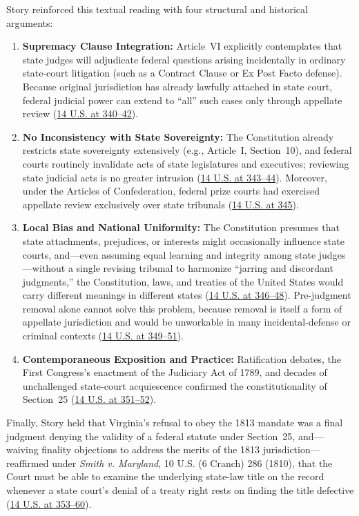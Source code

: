 \documentclass[12pt]{article}
\begin{document}
Story reinforced this textual reading with four structural and historical arguments:
\begin{enumerate}
    \item \textbf{Supremacy Clause Integration:} Article~VI explicitly contemplates that state judges will adjudicate federal questions arising incidentally in ordinary state-court litigation (such as a Contract Clause or Ex Post Facto defense). Because original jurisdiction has already lawfully attached in state court, federal judicial power can extend to ``all'' such cases only through appellate review (\href{https://supreme.justia.com/cases/federal/us/14/304/}{14 U.S. at 340--42}).
    \item \textbf{No Inconsistency with State Sovereignty:} The Constitution already restricts state sovereignty extensively (e.g., Article~I, Section~10), and federal courts routinely invalidate acts of state legislatures and executives; reviewing state judicial acts is no greater intrusion (\href{https://supreme.justia.com/cases/federal/us/14/304/}{14 U.S. at 343--44}). Moreover, under the Articles of Confederation, federal prize courts had exercised appellate review exclusively over state tribunals (\href{https://supreme.justia.com/cases/federal/us/14/304/}{14 U.S. at 345}).
    \item \textbf{Local Bias and National Uniformity:} The Constitution presumes that state attachments, prejudices, or interests might occasionally influence state courts, and---even assuming equal learning and integrity among state judges---without a single revising tribunal to harmonize ``jarring and discordant judgments,'' the Constitution, laws, and treaties of the United States would carry different meanings in different states (\href{https://supreme.justia.com/cases/federal/us/14/304/}{14 U.S. at 346--48}). Pre-judgment removal alone cannot solve this problem, because removal is itself a form of appellate jurisdiction and would be unworkable in many incidental-defense or criminal contexts (\href{https://supreme.justia.com/cases/federal/us/14/304/}{14 U.S. at 349--51}).
    \item \textbf{Contemporaneous Exposition and Practice:} Ratification debates, the First Congress's enactment of the Judiciary Act of 1789, and decades of unchallenged state-court acquiescence confirmed the constitutionality of Section~25 (\href{https://supreme.justia.com/cases/federal/us/14/304/}{14 U.S. at 351--52}).
\end{enumerate}

Finally, Story held that Virginia's refusal to obey the 1813 mandate was a final judgment denying the validity of a federal statute under Section~25, and---waiving finality objections to address the merits of the 1813 jurisdiction---reaffirmed under \textit{Smith v. Maryland}, 10 U.S. (6 Cranch) 286 (1810), that the Court must be able to examine the underlying state-law title on the record whenever a state court's denial of a treaty right rests on finding the title defective (\href{https://supreme.justia.com/cases/federal/us/14/304/}{14 U.S. at 353--60}).
\end{document}
